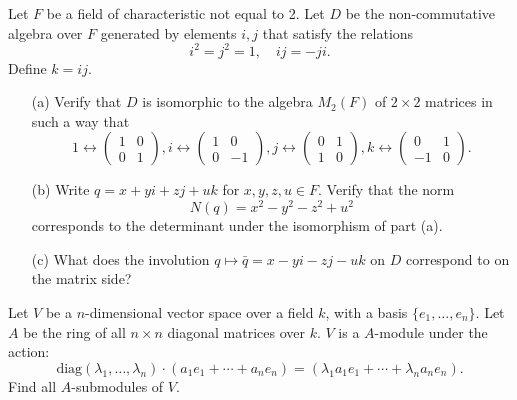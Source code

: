 \begin{prob}[S2018-Q1]
    Let \(F\) be a field of characteristic not equal to 2. Let \(D\) be the non-commutative algebra over \(F\) generated by elements \(i,j\) that satisfy the relations
    \[i^2 = j^2 = 1, \quad ij = -ji.\]
    Define \(k = ij.\)
    \begin{itemize}
        \item[(a)] Verify that \(D\) is isomorphic to the algebra \(M_2(F)\) of \(2 \times 2\) matrices in such a way that
        \[1 \leftrightarrow \begin{pmatrix} 1 & 0 \\ 0 & 1 \end{pmatrix}, i \leftrightarrow \begin{pmatrix} 1 & 0 \\ 0 & -1 \end{pmatrix}, j \leftrightarrow \begin{pmatrix} 0 & 1 \\ 1 & 0 \end{pmatrix}, k \leftrightarrow \begin{pmatrix} 0 & 1 \\ -1 & 0 \end{pmatrix}.\]
        \item[(b)] Write \(q = x + yi + zj + uk\) for \(x,y,z,u \in F\). Verify that the norm
        \[N(q) = x^2 - y^2 - z^2 + u^2\]
        corresponds to the determinant under the isomorphism of part (a).
        \item[(c)] What does the involution \(q \mapsto \bar{q} = x - yi - zj - uk\) on \(D\) correspond to on the matrix side?
    \end{itemize}
\end{prob}


\begin{prob}[S2006-Q3]
    Let \(V\) be a \(n\)-dimensional vector space over a field \(k\), with a basis \(\{e_1, \ldots, e_n\}\). Let \(A\) be the ring of all \(n \times n\) diagonal matrices over \(k\). \(V\) is a \(A\)-module under the action:
    \[\text{diag}(\lambda_1, \ldots, \lambda_n) \cdot (a_1 e_1 + \cdots + a_n e_n) = (\lambda_1 a_1 e_1 + \cdots + \lambda_n a_n e_n).\]
    Find all \(A\)-submodules of \(V\).
\end{prob}


